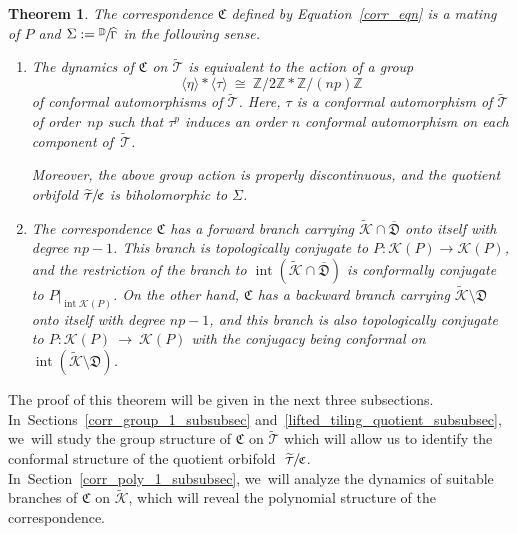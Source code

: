 \documentclass[JEP,XML,SOM,Unicode,NoFloatCountersInSection,published]{cedram}
\let\faktor\sfrac
\newtheorem{theorem}[lemma]{Theorem}
\theoremstyle{definition}
\theoremstyle{remark}
\newcommand{\D}{\mathbb{D}}
\newcommand{\Z}{\mathbb{Z}}
\newcommand{\cT}{\mathcal{T}}
\newcommand{\cK}{\mathcal{K}}
\DeclareMathOperator{\Int}{int}
\begin{document}
\begin{theorem}\label{corr_mating_thm_1}
The correspondence $\mathfrak{C}$ defined by Equation~\eqref{corr_eqn} is a mating of $P$ and $\Sigma:=\faktor{\D}{\widehat{\Gamma}}$ in the following sense.
\begin{enumerate}
\item The dynamics of $\mathfrak{C}$ on $\widetilde{\cT}$ is equivalent to the action of a group\vspace*{-3pt}
\[
\langle\eta\rangle\ast\langle\tau\rangle\ \cong\ \Z/2\Z\ast\Z/(np)\Z
\]
of conformal automorphisms of $\widetilde{\cT}$. Here, $\tau$ is a conformal automorphism of $\widetilde{\cT}$ of order~$np$ such that $\tau^p$ induces an order $n$ conformal automorphism on each component of~$\widetilde{\cT}$.

Moreover, the above group action is properly discontinuous, and the quotient orbifold $\faktor{\widetilde{\cT}}{\mathfrak{C}}$ is biholomorphic to $\Sigma$.

\item The correspondence $\mathfrak{C}$ has a forward branch carrying $\widetilde{\mathcal{K}}\cap\overline{\mathfrak{D}}$ onto itself with degree $np-1$. This branch is topologically conjugate to $P:\mathcal{K}(P)\to \mathcal{K}(P)$, and the restriction of the branch to $\Int{(\widetilde{\mathcal{K}}\cap\overline{\mathfrak{D}})}$ is conformally conjugate to $P\vert_{\Int{\cK(P)}}$. On the other hand, $\mathfrak{C}$ has a backward branch carrying $\widetilde{\mathcal{K}}\setminus\mathfrak{D}$ onto itself with degree $np-1$, and this branch is also topologically conjugate to $P:\mathcal{K}(P)~\to~\mathcal{K}(P)$ with the conjugacy being conformal on $\Int{(\widetilde{\mathcal{K}}\setminus\mathfrak{D})}$.
\end{enumerate}
\end{theorem}

The proof of this theorem will be given in the next three subsections. In~Sections~\ref{corr_group_1_subsubsec} and~\ref{lifted_tiling_quotient_subsubsec}, we~will study the group structure of $\mathfrak{C}$ on $\widetilde{\cT}$ which will allow us to identify the conformal structure of the quotient orbifold $\ \faktor{\widetilde{\cT}}{\mathfrak{C}}$. In~Section~\ref{corr_poly_1_subsubsec}, we~will analyze the dynamics of suitable branches of $\mathfrak{C}$ on $\widetilde{\mathcal{K}}$, which will reveal the polynomial structure of the correspondence.

\label{corr_group_1_subsubsec}
\end{document}
